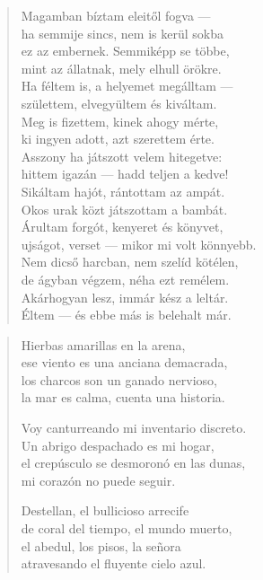 \documentclass[11pt]{extbook}
\newcommand*{\centeredornament}{\centerline{\pgfornament[width=6cm]{88}}}
\begin{document}
\begin{verse}
  Magamban bíztam eleitől fogva --- \\
  ha semmije sincs, nem is kerül sokba \\
  ez az embernek. Semmiképp se többe, \\
  mint az állatnak, mely elhull örökre. \\
  Ha féltem is, a helyemet megálltam --- \\
  születtem, elvegyültem és kiváltam. \\
  Meg is fizettem, kinek ahogy mérte, \\
  ki ingyen adott, azt szerettem érte. \\
  Asszony ha játszott velem hitegetve: \\
  hittem igazán --- hadd teljen a kedve! \\
  Sikáltam hajót, rántottam az ampát. \\
  Okos urak közt játszottam a bambát. \\
  Árultam forgót, kenyeret és könyvet, \\
  ujságot, verset --- mikor mi volt könnyebb. \\
  Nem dicső harcban, nem szelíd kötélen, \\
  de ágyban végzem, néha ezt remélem. \\
  Akárhogyan lesz, immár kész a leltár. \\
  Éltem --- és ebbe más is belehalt már.
\end{verse}

\newpage


\vspace*{-15mm}
\centeredornament



\begin{verse}
  Hierbas amarillas en la arena, \\
  ese viento es una anciana demacrada, \\
  los charcos son un ganado nervioso, \\
  la mar es calma, cuenta una historia.

  Voy canturreando mi inventario discreto. \\
  Un abrigo despachado es mi hogar, \\
  el crepúsculo se desmoronó en las dunas, \\
  mi corazón no puede seguir.

  Destellan, el bullicioso arrecife \\
  de coral del tiempo, el mundo muerto, \\
  el abedul, los pisos, la señora \\
  atravesando el fluyente cielo azul.
\end{verse}
\end{document}

